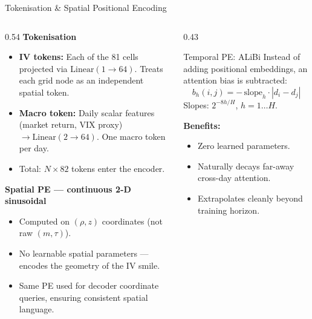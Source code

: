 \documentclass[aspectratio=169,10pt]{beamer}
\begin{document}
\begin{frame}{Tokenisation \& Spatial Positional Encoding}
  \begin{columns}[T]
    \begin{column}{0.54\textwidth}
      \textbf{Tokenisation}
      \begin{itemize}\itemsep3pt
        \item \textbf{IV tokens:} Each of the 81 cells projected via $\mathrm{Linear}(1\to64)$. Treats each grid node as an independent spatial token.
        \item \textbf{Macro token:} Daily scalar features (market return, VIX proxy) $\to\mathrm{Linear}(2\to64)$. One macro token per day.
        \item Total: $N\times82$ tokens enter the encoder.
      \end{itemize}
      \vspace{4pt}
      \textbf{Spatial PE --- continuous 2-D sinusoidal}
      \begin{itemize}\itemsep3pt
        \item Computed on $(\rho,z)$ coordinates (not raw $(m,\tau)$).
        \item No learnable spatial parameters --- encodes the geometry of the IV smile.
        \item Same PE used for decoder coordinate queries, ensuring consistent spatial language.
      \end{itemize}
    \end{column}
    \begin{column}{0.43\textwidth}
      \begin{block}{Temporal PE: ALiBi}
        \small
        Instead of adding positional embeddings, an attention bias is subtracted:
        \[
          b_h(i,j)=-\,\text{slope}_h\cdot|d_i-d_j|
        \]
        Slopes: $2^{-8h/H}$, $h=1\ldots H$.

        \textbf{Benefits:}
        \begin{itemize}\itemsep2pt
          \item Zero learned parameters.
          \item Naturally decays far-away cross-day attention.
          \item Extrapolates cleanly beyond training horizon.
        \end{itemize}
      \end{block}
    \end{column}
  \end{columns}
\end{frame}
\end{document}

